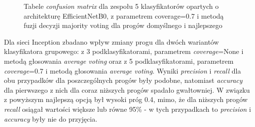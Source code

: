 \documentclass[polish,12pt]{aghthesis}
\begin{document}
\begin{figure}[H]
    \begin{adjustbox}{minipage=1.0\paperwidth, pagecenter}
    \centering
    \qquad
    \end{adjustbox}
    \label{fig:eff-ens-5-0.7-maj-thresh-matrices}
    \caption{Tabele \textit{confusion matrix} dla zespołu 5 klasyfikatorów opartych o architekturę EfficientNetB0, z parametrem coverage=0.7 i metodą fuzji decyzji majority voting dla progów domyślnego i najlepszego}
\end{figure}

Dla sieci Inception zbadano wpływ zmiany progu dla dwóch wariantów klasyfikatora grupowego: z 3 podklasyfikatorami, parametrem \textit{coverage}=None i metodą głosowania \textit{average voting} oraz z 5 podklasyfikatorami, parametrem \textit{coverage}=0.7 i metodą głosowania \textit{average voting}. Wyniki \textit{precision} i \textit{recall} dla obu przypadków dla poszczególnych progów były podobne, natomiast \textit{accuracy} dla pierwszego z nich dla coraz niższych progów spadało gwałtowniej. W związku z powyższym najlepszą opcją był wysoki próg 0.4, mimo, że dla niższych progów \textit{recall} osiągał wartości większe lub równe 95\% - w tych przypadkach to \textit{precision} i \textit{accuracy} były nie do przyjęcia. 
\end{document}
